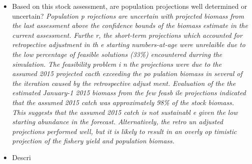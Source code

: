 {\begin{itemize}{}
f so, is the pattern minor, or major? (A major retrospective pattern occurs whe
n the adjusted SSB or $F_{Full}${} lies outside of the approximate joint confid
ence region for SSB and $F_{Full}${}; see RhoDecisionTab.ref). \linebreak{} \hs
pace*{0.5cm} \textit{ The 7-year Mohn's \textrho{}, relative to SSB, was 0.14 i
n the 2012 assessment and was 1.06 in 2014. The 7-year Mohn's \textrho{}, relat
ive to F, was -0.16 in the 2012 assessment and was -0.53 in 2014. There was a m
ajor retrospective pattern for this assessment because the \textrho{} adjusted 
estimates of 2014 SSB ($SSB_{\rho}${}=502) and 2014 F ($F_{\rho}${}=1.64) were 
outside the approximate 90\% confidence regions around SSB (355 - 739) and F (1
.053 - 2.348). However, a retrospective adjustment was not made for both the de
termination of stock status and for projections of catch because of the large p
roportion of unfeasible projections (assumed 2015 catch required a fishing mort
ality rate greater than 5). This implies the retrospective adjustment was too l
arge or the assumed 2015 catch was too high. The review panel decided to use th
e unadjusted projections as an upper bound for OFL with the strong suggestion t
hat the OFL estimates were too high (meaning the ABC buffer should be larger th
an normal).} \item{}Based on this stock assessment, are population projections 
well determined or uncertain? \linebreak{} \hspace*{0.5cm} \textit{Population p
rojections are uncertain with projected biomass from the last assessment above 
the confidence bounds of the biomass estimate in the current assessment. Furthe
r, the short-term projections which accounted for retropective adjustment in th
e starting numbers-at-age were unrelaible due to the low percentage of feasible
 solutions (33\%) encountered durring the simulation. The feasibility problem i
n the projections were due to the assumed 2015 projected cacth exceeding the po
pulation biomass in several of the iteration caused by the retrospective adjust
ment. Evaluation of the the estimated January-1 2015 biomass from the few feasb
ile projections indicated that the assumed 2015 catch was approximately 98\% of
 the stock biomass. This suggests that the assumed 2015 catch is not sustainabl
e given the low starting abundance in the forecast. Alternatively, the retro un
adjusted projections performed well, but it is likely to result in an overly op
timistic projection of the fishery yield and population biomass.} \item{}Descri

\end{itemize}}
